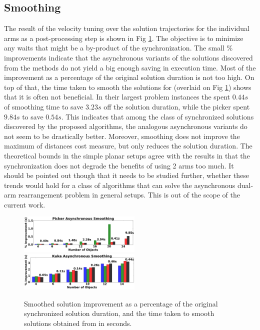 \subsection{Smoothing}
The result of the velocity tuning over the solution trajectories for the individual arms as a post-processing step is shown in Fig \ref{fig:smoothing}. The objective is to minimize any waits that might be a by-product of the synchronization. 
The small \% improvements indicate that the asynchronous variants of the solutions discovered from the methods do not yield a big enough saving in execution time. 
Most of the improvement as a percentage of the original solution duration is not too high. On top of that, the time taken to smooth the solutions for \algo (overlaid on Fig \ref{fig:smoothing}) shows that it is often not beneficial.
In their largest problem instances the \kuka spent $ 0.44s $ of smoothing time to save $ 3.23s $ off the solution duration, while the picker spent $  9.84s $ to save $ 0.54s $.
This indicates that among the class of synchronized solutions discovered by the proposed algorithms, the analogous asynchronous variants do not seem to be drastically better. Moreover, smoothing does not improve the maximum of distances cost measure, but only reduces the solution duration. The theoretical bounds in the simple planar setups agree with the results in that the synchronization does not degrade the benefits of using 2 arms too much. It should be pointed out though that it needs to be studied further, whether these trends would hold for a class of algorithms that can solve the asynchronous dual-arm rearrangement problem in general setups. This is out of the scope of the current work.
 


\begin{figure}
	\centering
	\includegraphics[width=2.3in]{figures/results/sp_smoothing}
	\includegraphics[width=2.3in]{figures/results/kuka_smoothing}
	\caption{Smoothed solution improvement as a percentage of the original synchronized solution duration, and the time taken to smooth solutions obtained from \algo in seconds.}
	\label{fig:smoothing}
\end{figure}

